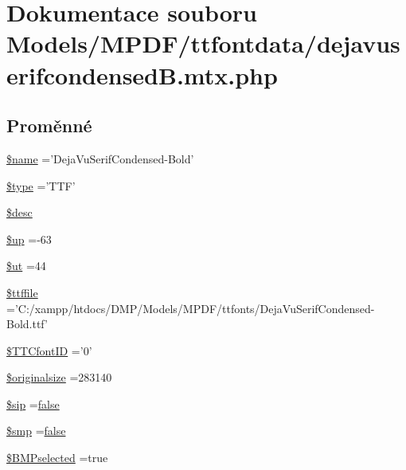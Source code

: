 \hypertarget{dejavuserifcondensed_b_8mtx_8php}{\section{Dokumentace souboru Models/\-M\-P\-D\-F/ttfontdata/dejavuserifcondensed\-B.mtx.\-php}
\label{dejavuserifcondensed_b_8mtx_8php}
}
\subsection*{Proměnné}
\begin{DoxyCompactItemize}
\item 
\hyperlink{dejavuserifcondensed_b_8mtx_8php_ab2fc40d43824ea3e1ce5d86dee0d763b}{\$name} ='Deja\-Vu\-Serif\-Condensed-\/Bold'
\item 
\hyperlink{dejavuserifcondensed_b_8mtx_8php_a9a4a6fba2208984cabb3afacadf33919}{\$type} ='T\-T\-F'
\item 
\hyperlink{dejavuserifcondensed_b_8mtx_8php_a31059b9e4d0c5af34df20da32232ea9a}{\$desc}
\item 
\hyperlink{dejavuserifcondensed_b_8mtx_8php_a6b5ad2ac55f9df46e8f34e78fbd6f176}{\$up} =-\/63
\item 
\hyperlink{dejavuserifcondensed_b_8mtx_8php_aadd3f841051043ee58e587e840e8dd0b}{\$ut} =44
\item 
\hyperlink{dejavuserifcondensed_b_8mtx_8php_ab04cc39aa4badf22904a8e6ec08f49a9}{\$ttffile} ='C\-:/xampp/htdocs/D\-M\-P/Models/M\-P\-D\-F/ttfonts/Deja\-Vu\-Serif\-Condensed-\/Bold.\-ttf'
\item 
\hyperlink{dejavuserifcondensed_b_8mtx_8php_ac3b78779654cec2ec1f552d784f1b5f0}{\$\-T\-T\-Cfont\-I\-D} ='0'
\item 
\hyperlink{dejavuserifcondensed_b_8mtx_8php_a25e8bdbc8267d6e88bc21fde74a2c0e8}{\$originalsize} =283140
\item 
\hyperlink{dejavuserifcondensed_b_8mtx_8php_ac07984f1157f4b24cd953085cfc7d40c}{\$sip} =\hyperlink{ttfontsuni_8php_afbaa04e5cc97693dc668b3c45d3dd740}{false}
\item 
\hyperlink{dejavuserifcondensed_b_8mtx_8php_a7c2b1e4834c6dab47a78d2564d23935c}{\$smp} =\hyperlink{ttfontsuni_8php_afbaa04e5cc97693dc668b3c45d3dd740}{false}
\item 
\hyperlink{dejavuserifcondensed_b_8mtx_8php_a67fd6f661058b6635618e65431505e9b}{\$\-B\-M\-Pselected} =true
\item 

\end{DoxyCompactItemize}
